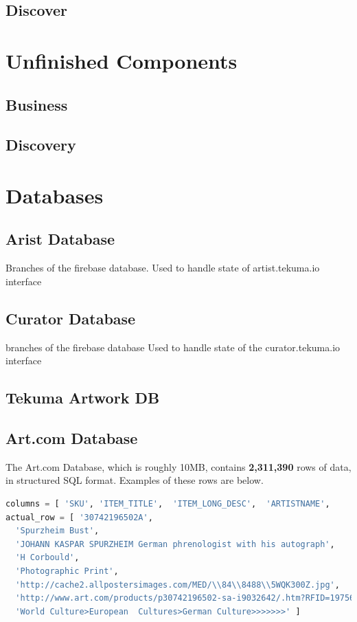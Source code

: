 \documentclass[fontsize=12pt]{scrartcl} %
\numberwithin{equation}{section} %
\numberwithin{figure}{section} %
\numberwithin{table}{section} %
\begin{document}
\subsection{Discover}


\section{Unfinished Components}
\subsection{Business}
\subsection{Discovery}

\section{Databases}
\subsection{Arist Database}
Branches of the firebase database.
Used to handle state of artist.tekuma.io interface

\subsection{Curator Database}
branches of the firebase database
Used to handle state of the curator.tekuma.io interface

\subsection{Tekuma Artwork DB}

\subsection{Art.com Database}
The Art.com Database, which is roughly 10MB, contains \textbf{2,311,390} rows of data, in structured SQL format. Examples of these rows are below.\\

\begin{lstlisting}[language=Python]
columns = [ 'SKU', 'ITEM_TITLE',  'ITEM_LONG_DESC',  'ARTISTNAME',    'ITEM_TYPE',  'IMAGE_URL',  'PRODUCT_URL', 'PRODUCT_TAXONOMY' ]
actual_row = [ '30742196502A',
  'Spurzheim Bust',
  'JOHANN KASPAR SPURZHEIM German phrenologist with his autograph',
  'H Corbould',
  'Photographic Print',
  'http://cache2.allpostersimages.com/MED/\\84\\8488\\5WQK300Z.jpg',
  'http://www.art.com/products/p30742196502-sa-i9032642/.htm?RFID=197560',
  'World Culture>European  Cultures>German Culture>>>>>>>' ]
\end{lstlisting}
\end{document}
